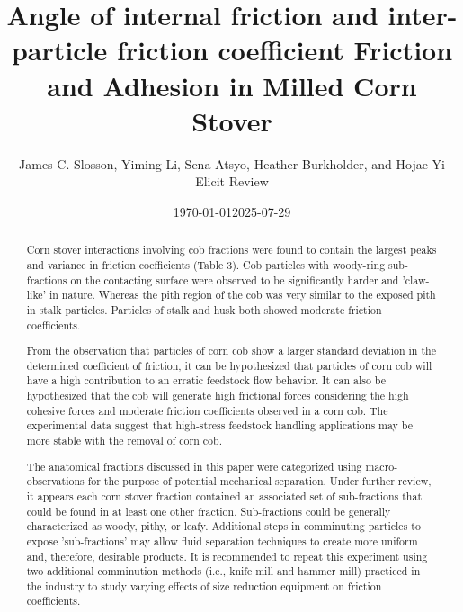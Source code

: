 \documentclass[xcolor=dvipsnames,10pt,hidelinks]{article}
\author{James C. Slosson, Yiming Li, Sena Atsyo, Heather Burkholder, and Hojae Yi Elicit Review}
\date{\today 2025-07-29}
\title{Angle of internal friction and inter-particle friction coefficient Friction and Adhesion in Milled Corn Stover}
\begin{document}
\maketitle
\begin{abstract}
Corn stover interactions involving cob fractions were found to contain the largest peaks and variance in friction coefficients (Table 3).
Cob particles with woody-ring sub-fractions on the contacting surface were observed to be significantly harder and 'claw-like' in nature.
Whereas the pith region of the cob was very similar to the exposed pith in stalk particles. Particles of stalk and husk both showed moderate friction coefficients.

From the observation that particles of corn cob show a larger standard deviation in the determined coefficient of friction, it can be hypothesized that particles of corn cob will have a high contribution to an erratic feedstock flow behavior.
It can also be hypothesized that the cob will generate high frictional forces considering the high cohesive forces and moderate friction coefficients observed in a corn cob.
The experimental data suggest that high-stress feedstock handling applications may be more stable with the removal of corn cob.

The anatomical fractions discussed in this paper were categorized using macro-observations for the purpose of potential mechanical separation.
Under further review, it appears each corn stover fraction contained an associated set of sub-fractions that could be found in at least one other fraction.
Sub-fractions could be generally characterized as woody, pithy, or leafy.
Additional steps in comminuting particles to expose 'sub-fractions' may allow fluid separation techniques to create more uniform and, therefore, desirable products.
It is recommended to repeat this experiment using two additional comminution methods (i.e., knife mill and hammer mill) practiced in the industry to study varying effects of size reduction equipment on friction coefficients.
\end{abstract}
\end{document}
